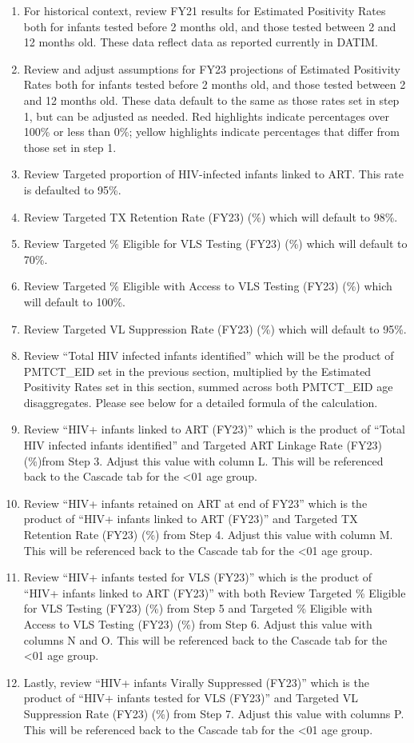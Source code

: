 \documentclass[
  openany]{book}
\begin{document}
\begin{enumerate}
\def\labelenumi{\arabic{enumi}.}
\item
  For historical context, review FY21 results for Estimated Positivity Rates both for infants tested before 2 months old, and those tested between 2 and 12 months old. These data reflect data as reported currently in DATIM.
\item
  Review and adjust assumptions for FY23 projections of Estimated Positivity Rates both for infants tested before 2 months old, and those tested between 2 and 12 months old. These data default to the same as those rates set in step 1, but can be adjusted as needed. Red highlights indicate percentages over 100\% or less than 0\%; yellow highlights indicate percentages that differ from those set in step 1.
\item
  Review Targeted proportion of HIV-infected infants linked to ART. This rate is defaulted to 95\%.
\item
  Review Targeted TX Retention Rate (FY23) (\%) which will default to 98\%.
\item
  Review Targeted \% Eligible for VLS Testing (FY23) (\%) which will default to 70\%.
\item
  Review Targeted \% Eligible with Access to VLS Testing (FY23) (\%) which will default to 100\%.
\item
  Review Targeted VL Suppression Rate (FY23) (\%) which will default to 95\%.
\item
  Review ``Total HIV infected infants identified'' which will be the product of PMTCT\_EID set in the previous section, multiplied by the Estimated Positivity Rates set in this section, summed across both PMTCT\_EID age disaggregates. Please see below for a detailed formula of the calculation.
\item
  Review ``HIV+ infants linked to ART (FY23)'' which is the product of ``Total HIV infected infants identified'' and Targeted ART Linkage Rate (FY23) (\%)from Step 3. Adjust this value with column L. This will be referenced back to the Cascade tab for the \textless01 age group.
\item
  Review ``HIV+ infants retained on ART at end of FY23'' which is the product of ``HIV+ infants linked to ART (FY23)'' and Targeted TX Retention Rate (FY23) (\%) from Step 4. Adjust this value with column M. This will be referenced back to the Cascade tab for the \textless01 age group.
\item
  Review ``HIV+ infants tested for VLS (FY23)'' which is the product of ``HIV+ infants linked to ART (FY23)'' with both Review Targeted \% Eligible for VLS Testing (FY23) (\%) from Step 5 and Targeted \% Eligible with Access to VLS Testing (FY23) (\%) from Step 6. Adjust this value with columns N and O. This will be referenced back to the Cascade tab for the \textless01 age group.
\item
  Lastly, review ``HIV+ infants Virally Suppressed (FY23)'' which is the product of ``HIV+ infants tested for VLS (FY23)'' and Targeted VL Suppression Rate (FY23) (\%) from Step 7. Adjust this value with columns P. This will be referenced back to the Cascade tab for the \textless01 age group.
\end{enumerate}
\end{document}
